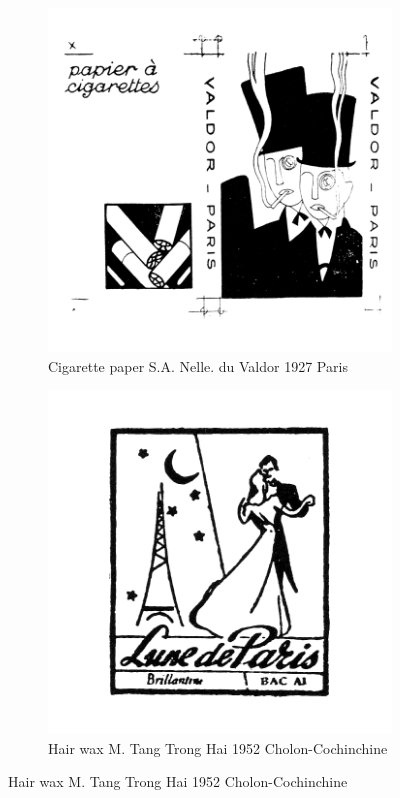 \begin{figure}[h]
  \begin{subfigure}{.45\textwidth}
    \centering
    \includegraphics[width=.5\linewidth]{images/supplement/trademarks/french/20_7}
    \caption{Cigarette paper S.A. Nelle. du Valdor 1927 Paris}
    \label{fig:trademarks:french:20.7}
  \end{subfigure}\hfill
  \begin{subfigure}{.45\textwidth}
    \centering
    \includegraphics[width=.5\linewidth]{images/supplement/trademarks/french/20_21}
    \caption{Hair wax M. Tang Trong Hai 1952 Cholon-Cochinchine}
    \label{fig:trademarks:french:20.21}
  \end{subfigure}


\end{figure}
